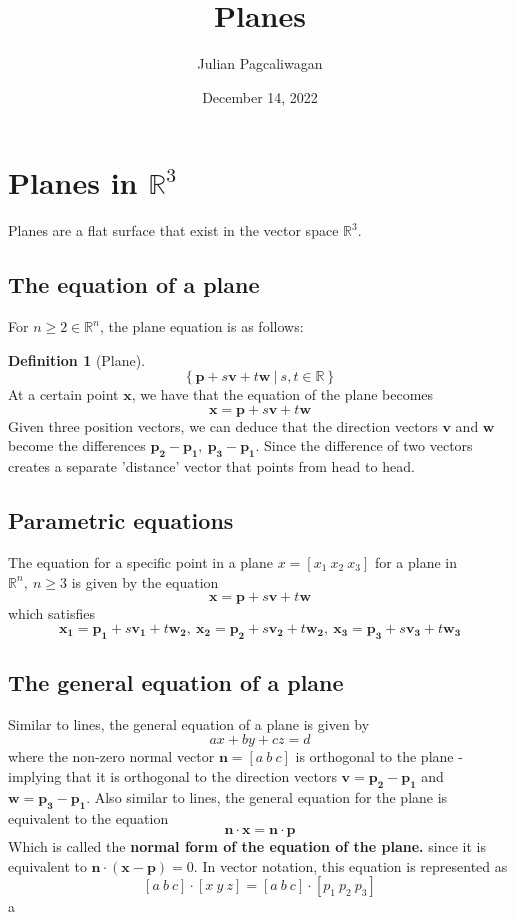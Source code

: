 \documentclass{report}
\title{Planes}
\author{Julian Pagcaliwagan}
\date{December 14, 2022}
\theoremstyle{definition}
\newtheorem{definition}{Definition}
\begin{document}
\maketitle
\section*{Planes in $ \mathbb{R}^3 $}
    Planes are a flat surface that exist in the vector space $ \mathbb{R}^3 $.
    \subsection*{The equation of a plane}
        For $ n \geq 2 \in\mathbb{R}^n $, the plane equation is as follows:
        \begin{definition}[Plane]
            \[
                \left\{ \mathbf{p} + s \mathbf{v} + t \mathbf{w} \ | \ s, t \in \mathbb{R} \right\}
            \]
            At a certain point $ \mathbf{x} $, we have that the equation of the plane becomes
            \[
                \mathbf{x} = \mathbf{p} + s \mathbf{v} + t \mathbf{w}
            \] 
            \noindent Given three position vectors, we can deduce that the direction vectors $ \mathbf{v} $ and $ \mathbf{w} $ become the differences $ \mathbf{p_2 - p_1}, \ \mathbf{p_3 - p_1} $. Since the difference of two vectors creates a separate 'distance' vector that points from head to head.
        \end{definition}    
    \subsection*{Parametric equations}
        The equation for a specific point in a plane $ x = \left[ x_1 \ x_2 \ x_3 \right] $ for a plane in $ \mathbb{R}^n, \ n \geq 3 $ is given by the equation
        \[
            \mathbf{x} = \mathbf{p} + s \mathbf{v} + t \mathbf{w}
        \]
        which satisfies
        \[
            \mathbf{x_1} = \mathbf{p_1} + s \mathbf{v_1} + t \mathbf{w_2}, \ \mathbf{x_2} = \mathbf{p_2} + s \mathbf{v_2} + t \mathbf{w_2}, \ \mathbf{x_3} = \mathbf{p_3} + s \mathbf{v_3} + t \mathbf{w_3}
        \]
    \subsection*{The general equation of a plane}
        Similar to lines, the general equation of a plane is given by
        \[
            ax + by +cz = d
        \]
        where the non-zero normal vector $ \mathbf{n} = \left[ a \ b \ c \right] $ is orthogonal to the plane - implying that it is orthogonal to the direction vectors $ \mathbf{v} = \mathbf{p_2 - p_1} $ and $ \mathbf{w} = \mathbf{p_3 - p_1} $.
        Also similar to lines, the general equation for the plane is equivalent to the equation
        \[
            \mathbf{n} \cdot \mathbf{x} = \mathbf{n} \cdot \mathbf{p}
        \]
        Which is called the \textbf{normal form of the equation of the plane.} since it is equivalent to $ \mathbf{n} \cdot ( \mathbf{x} - \mathbf{p}) = 0 $. In vector notation, this equation is represented as
        \[
            \left[ a \ b \ c \right] \cdot \left[ x \ y \ z \right] = \left[ a \ b \ c \right] \cdot \left[ p_1 \ p_2 \ p_3 \right]
        \]
a
\end{document}
